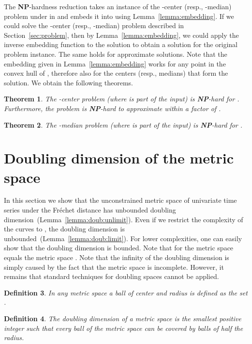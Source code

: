 \documentclass[11pt, letter]{article}
\newtheorem{theorem}{Theorem}[section]
\newtheorem{definition}[theorem]{Definition}
\newcommand{\secref}[1]{Section~\ref{sec:#1}}
\newcommand{\thmlab}[1]{{\label{theo:#1}}}
\newcommand{\lemref}[1]{Lemma~\ref{lemma:#1}}
\newcommand{\NP}{\textbf{NP}} \newcommand{\spine}{\textsl{spine}}
\newcommand{\Frechet}{Fr\'echet\xspace}
\begin{document}
 The \textbf{NP}-hardness reduction takes an instance of the -center (resp.,
-median) problem under  in  and embeds it into 
using \lemref{embedding}.  If we could solve the -center (resp.,
-median) problem described in \secref{problem}, then by
\lemref{embedding}, we could apply the inverse embedding function to the
solution to obtain a solution for the original problem instance. The same holds
for approximate solutions. Note that the embedding given in \lemref{embedding}
works for any point in the convex hull of , therefore also for the centers
(resp., medians) that form the solution. We obtain the following theorems.

\begin{theorem}\thmlab{center:nphard}
The -center problem (where  is part of the input) is \NP-hard for
.  Furthermore, the problem is \NP-hard to approximate within a
factor of .
\end{theorem}

\begin{theorem}\thmlab{median:nphard}
The -median problem (where  is part of the input) 
is \NP-hard for . 
\end{theorem}









\section{Doubling dimension of the metric space}
\label{section:doublingdimension}


In this section we show that the unconstrained metric space of univariate time series 
under the \Frechet distance has unbounded doubling dimension~(\lemref{doub:unlimit}).
Even if we restrict the complexity of the curves 
to , the 
doubling dimension is unbounded~(\lemref{doub:limit}). 
For lower complexities, one can easily
show that the doubling dimension is bounded. Note that for  the 
metric space  equals the metric space . 
Note that the infinity of the doubling dimension is simply caused by the fact that the
metric space is incomplete. However, it remains that standard techniques for
doubling spaces cannot be applied.


\begin{definition}
In any metric space  a ball of center  and radius   is defined as the set
.
\end{definition}

\begin{definition}
The doubling dimension of a metric space is the smallest positive integer 
such that every ball of the metric space can be covered by  balls of half
the radius. 
\end{definition}
\end{document}

